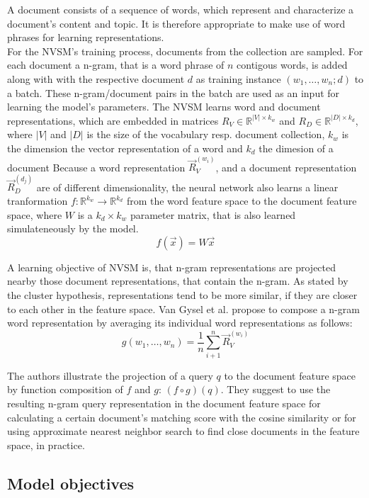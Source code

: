 A document consists of a sequence of words,
    which represent and characterize a document's content and topic.
It is therefore appropriate to make use of word phrases
    for learning representations.\\
For the NVSM's training process, documents from the collection are
    sampled.
For each document a n-gram, that is a word phrase of $n$ 
    contigous words, is added
    along with with the respective document $d$ as
    training instance $(w_1, \ldots, w_n; d)$ to a batch.
These n-gram/document pairs in the batch are used
    as an input for learning the model's parameters.
The NVSM learns word and document representations,
    which are embedded in matrices $R_V \in \mathbb{R}^{|V| \times k_w}$
    and $R_D \in \mathbb{R}^{|D| \times k_d}$, where 
    $|V|$ and $|D|$ is the size of the vocabulary resp. document collection,
    $k_w$ is the dimension the vector representation of a word and
    $k_d$ the dimesion of a document
Because a word representation $\vec{R}_V^{(w_i)}$,
    and a document representation $\vec{R}_D^{(d_j)}$ are of different
    dimensionality, the neural network also learns a linear
    tranformation $f \colon \mathbb{R}^{k_w} \to \mathbb{R}^{k_d}$ 
    from the word feature space to the document feature space,
    where $W$ is a $k_d \times k_w$ parameter matrix, that is 
    also learned simulateneously by the model.
\[
f(\vec{x}) = W\vec{x}
\]

A learning objective of NVSM is, that n-gram representations are projected
    nearby those document representations, that contain the n-gram.
As stated by the cluster hypothesis, representations tend to be 
    more similar, if they are closer to each other in the feature space.
Van Gysel et al. propose to compose a n-gram word representation by
    averaging its individual word representations as follows:
\[
g(w_1, \ldots, w_n) = \frac{1}{n} \sum_{i+1}^{n} \vec{R}_V^{(w_i)}
\]

The authors illustrate the projection of a query $q$ to the document
    feature space by function composition of $f$ and $g$: $(f \circ g)(q)$.
They suggest to use the resulting n-gram query representation in the document 
    feature space for calculating a certain document's matching score
    with the cosine similarity or for using approximate 
    nearest neighbor search to find close documents in the 
    feature space, in practice.\cite{van-gysel:2017:neural-vector-spaces}

\subsection*{Model objectives}

